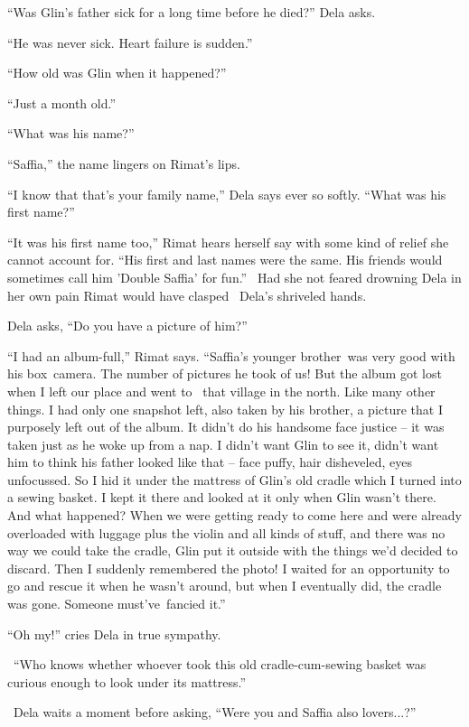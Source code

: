 \documentclass[twoside,11pt]{book}
\begin{document}
``Was Glin's father sick for a long time before he died?'' Dela asks.

``He was never sick. Heart failure is sudden.''

``How old was Glin when it happened?''

``Just a month old.''

``What was his name?''

``Saffia,'' the name lingers on Rimat's lips.

``I know that that's your family name,'' Dela says ever so softly. ``What was his
first name?''

``It was his first name too,'' Rimat hears herself say with some kind of relief she cannot
account for. ``His first and last names were the same. His friends would sometimes call him 'Double
Saffia' for fun.'' \ Had she not feared drowning Dela in her own pain Rimat would have clasped \ Dela's
shriveled hands.

Dela asks, ``Do you have a picture of him?''

``I had an album-full,'' Rimat says. ``Saffia's younger brother~was very good
with his box~camera. The number of pictures he took of us! But the album got lost when I left our place and went to
\ that village in the north. Like many other things. I had only one snapshot left, also taken by his brother, a picture
that I purposely left out of the album. It didn't do his handsome face justice -- it was taken just as he woke up from
a nap. I didn't want Glin to see it, didn't want him to think his father looked like that -- face puffy, hair
disheveled, eyes unfocussed. So I hid it under the mattress of Glin's old cradle which I turned into a sewing basket. I
kept it there and looked at it only when Glin wasn't there. And what happened? When we were getting ready to come here
and were already overloaded with luggage plus the violin and all kinds of stuff, and there was no way we could take the
cradle, Glin put it outside with the things we'd decided to discard. Then I suddenly remembered the photo! I waited for
an opportunity to go and rescue it when he wasn't around, but when I eventually did, the cradle was gone. Someone
must've~fancied it.''

``Oh my!'' cries Dela in true sympathy.

~``Who knows whether whoever took this old cradle-cum-sewing basket was curious enough to look under its
mattress.''

~Dela waits a moment before asking, ``Were you and Saffia also lovers...?''
\end{document}

